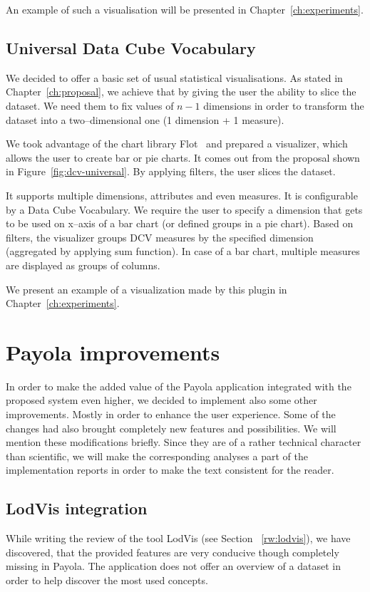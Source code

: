 An example of such a visualisation will be presented in 
Chapter~\ref{ch:experiments}.

\subsection{Universal Data Cube Vocabulary}
We decided to offer a basic set of usual statistical visualisations. As stated 
in Chapter~\ref{ch:proposal}, we achieve that by giving the user the ability to 
slice the dataset. We need them to fix values of $n-1$ dimensions in order to 
transform the dataset into a two--dimensional one (1 dimension + 1 measure).

We took advantage of the chart library Flot~\cite{flot} and prepared a 
visualizer, which allows the user to create bar or pie charts. It 
comes out from the proposal shown in Figure~\ref{fig:dcv-universal}. By 
applying filters, the user slices the dataset.

It supports multiple dimensions, attributes and even measures. It is 
configurable by a Data Cube Vocabulary. We require the user to specify a 
dimension that gets to be used on x--axis of a bar chart (or defined groups in a 
pie chart). Based on filters, the visualizer groups DCV measures by the specified 
dimension (aggregated by applying sum function). In case of a bar chart, multiple measures are 
displayed as groups of columns.

We present an example of a visualization made by this plugin in 
Chapter~\ref{ch:experiments}.

\section{Payola improvements}
In order to make the added value of the Payola application integrated with the 
proposed system even higher, we decided to implement also some other
improvements. Mostly in order to enhance the user experience. Some of the changes
had also brought completely new features and possibilities. We will mention 
these modifications briefly. Since they are of a rather technical character 
than scientific, we will make the corresponding analyses a part of the 
implementation reports in order to make the text consistent for the reader.

\subsection{LodVis integration}
While writing the review of the tool LodVis (see Section ~\ref{rw:lodvis}), 
we have discovered, that the provided features are very conducive though completely 
missing in Payola. The application does not offer an overview of a dataset in order 
to help discover the most used concepts.

